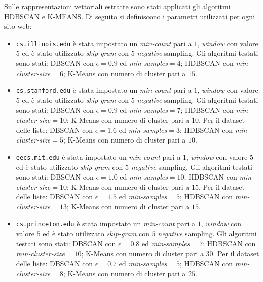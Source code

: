 Sulle rappresentazioni vettoriali estratte sono stati applicati gli algoritmi HDBSCAN e K-MEANS.
Di seguito si definiscono i parametri utilizzati per ogni sito web: 
\begin{itemize}
\begin{figure}[h!]
	\centering
	\texttt{[image: lc\_embedding\_km.png]}
	\caption{Rappresentazione del sito \texttt{cs.illinois.edu}, clusterizzato con K-Means.}
	\label{nc_embedding_km}
\end{figure}

\item \texttt{cs.illinois.edu} è stata impostato un \textit{min-count} pari a $1$, \textit{window} con valore $5$ ed è stato utilizzato \textit{skip-gram} con $5$ \textit{negative} sampling. Gli algoritmi testati sono stati: DBSCAN con $\epsilon = 0.9$ ed \textit{min-samples}$ = 4$; HDBSCAN con \textit{min-cluster-size}$=6$; K-Means con numero di cluster pari a $15$. 
\item \texttt{cs.stanford.edu} è stata impostato un \textit{min-count} pari a $1$, \textit{window} con valore $5$ ed è stato utilizzato \textit{skip-gram} con $5$ \textit{negative} sampling. Gli algoritmi testati sono stati: DBSCAN con $\epsilon = 0.9$ ed \textit{min-samples}$ = 7$; HDBSCAN con \textit{min-cluster-size}$=10$; K-Means con numero di cluster pari a $10$. Per il dataset delle liste: DBSCAN con $\epsilon = 1.6$ ed \textit{min-samples}$ = 3$; HDBSCAN con \textit{min-cluster-size}$=5$; K-Means con numero di cluster pari a $10$.
\item \texttt{eecs.mit.edu} è stata impostato un \textit{min-count} pari a $1$, \textit{window} con valore $5$ ed è stato utilizzato \textit{skip-gram} con $5$ \textit{negative} sampling. Gli algoritmi testati sono stati: DBSCAN con $\epsilon = 1.0$ ed \textit{min-samples}$ = 10$; HDBSCAN con \textit{min-cluster-size}$=10$; K-Means con numero di cluster pari a $15$. Per il dataset delle liste: DBSCAN con $\epsilon = 1.5$ ed \textit{min-samples}$ = 5$; HDBSCAN con \textit{min-cluster-size}$=13$; K-Means con numero di cluster pari a $15$.
\item \texttt{cs.princeton.edu} è stata impostato un \textit{min-count} pari a $1$, \textit{window} con valore $5$ ed è stato utilizzato \textit{skip-gram} con $5$ \textit{negative} sampling. Gli algoritmi testati sono stati: DBSCAN con $\epsilon = 0.8$ ed \textit{min-samples}$ = 7$; HDBSCAN con \textit{min-cluster-size}$=10$; K-Means con numero di cluster pari a $30$. Per il dataset delle liste: DBSCAN con $\epsilon = 0.7$ ed \textit{min-samples}$ = 5$; HDBSCAN con \textit{min-cluster-size}$=8$; K-Means con numero di cluster pari a $25$.

\end{itemize}
